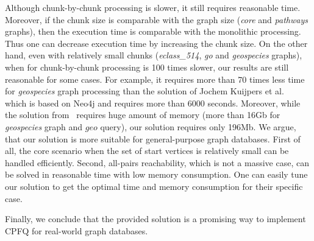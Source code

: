 Although chunk-by-chunk processing is slower, it still requires reasonable time.
Moreover, if the chunk size is comparable with the graph size (\textit{core} and \textit{pathways} graphs), then the execution time is comparable with the monolithic processing.
Thus one can decrease execution time by increasing the chunk size.
On the other hand, even with relatively small chunks (\textit{eclass\_514}, \textit{go} and \textit{geospecies} graphs), when for chunk-by-chunk processing is 100 times slower, our results are still reasonable for some cases.
For example, it requires more than 70 times less time for \textit{geospecies} graph processing than the solution of Jochem Kuijpers et al.~\cite{Kuijpers:2019:ESC:3335783.3335791} which is based on Neo4j and requires more than 6000 seconds.
Moreover, while the solution from~\cite{10.1145/3398682.3399163} requires huge amount of memory (more than 16Gb for \textit{geospecies} graph and $geo$ query), our solution requires only 196Mb.
We argue, that our solution is more suitable for general-purpose graph databases.
First of all, the core scenario when the set of start vertices is relatively small can be handled efficiently.
Second, all-pairs reachability, which is not a massive case, can be solved in reasonable time with low memory consumption.
One can easily tune our solution to get the optimal time and memory consumption for their specific case.

Finally, we conclude that the provided solution is a promising way to implement CPFQ for real-world graph databases.

